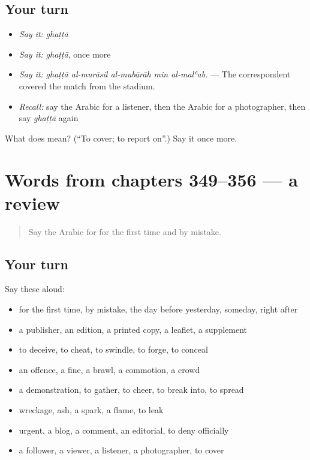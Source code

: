 \subsection*{Your turn}
\begin{itemize}
\raggedright
  \item \emph{Say it:} \emph{ghaṭṭā}
  \item \emph{Say it:} \emph{ghaṭṭā}, once more
  \item \emph{Say it:} \emph{ghaṭṭā al-murāsil al-mubārāh min al-malʿab.} — The correspondent covered the match from the stadium.
  \item \emph{Recall:} say the Arabic for a listener, then the Arabic for a photographer, then say \emph{ghaṭṭā} again
\end{itemize}

\begin{tcolorbox}[breakable,colback=teal!4,colframe=teal!35!black,title={Before you move on}]
What does  mean? (\textquotedblleft{}To cover; to report on\textquotedblright{}.) Say it once more.
\end{tcolorbox}
\section[(dialogue)]{Words from chapters 349–356 — a review}

\label{lesson:AR-R356-review-349-356}



\begin{quote}
Say the Arabic for for the first time and by mistake.
\end{quote}

\subsection*{Your turn}
Say these aloud:

\begin{itemize}
\raggedright
  \item for the first time, by mistake, the day before yesterday, someday, right after
  \item a publisher, an edition, a printed copy, a leaflet, a supplement
  \item to deceive, to cheat, to swindle, to forge, to conceal
  \item an offence, a fine, a brawl, a commotion, a crowd
  \item a demonstration, to gather, to cheer, to break into, to spread
  \item wreckage, ash, a spark, a flame, to leak
  \item urgent, a blog, a comment, an editorial, to deny officially
  \item a follower, a viewer, a listener, a photographer, to cover
\end{itemize}

